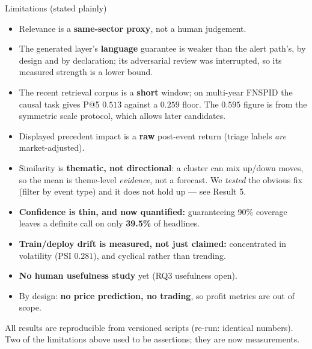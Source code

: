 \documentclass[aspectratio=169]{beamer}
\begin{document}
\begin{frame}{Limitations (stated plainly)}
\begin{itemize}
  \item Relevance is a \textbf{same-sector proxy}, not a human judgement.
  \item The generated layer's \textbf{language} guarantee is weaker than the alert path's, by design and by declaration; its adversarial review was interrupted, so its measured strength is a lower bound.
  \item The recent retrieval corpus is a \textbf{short} window; on multi-year FNSPID the causal task gives P@5 $0.513$ against a $0.259$ floor. The $0.595$ figure is from the symmetric scale protocol, which allows later candidates.
  \item Displayed precedent impact is a \textbf{raw} post-event return (triage labels \emph{are} market-adjusted).
  \item Similarity is \textbf{thematic, not directional}: a cluster can mix up/down moves, so the mean is theme-level \emph{evidence}, not a forecast. We \emph{tested} the obvious fix (filter by event type) and it does not hold up --- see Result 5.
  \item \textbf{Confidence is thin, and now quantified:} guaranteeing 90\% coverage leaves a definite call on only \textbf{39.5\%} of headlines.
  \item \textbf{Train/deploy drift is measured, not just claimed:} concentrated in volatility (PSI $0.281$), and cyclical rather than trending.
  \item \textbf{No human usefulness study} yet (RQ3 usefulness open).
  \item By design: \textbf{no price prediction, no trading}, so profit metrics are out of scope.
\end{itemize}
\vfill
\footnotesize All results are reproducible from versioned scripts (re-run: identical numbers).
Two of the limitations above used to be assertions; they are now measurements.
\end{frame}
\end{document}
